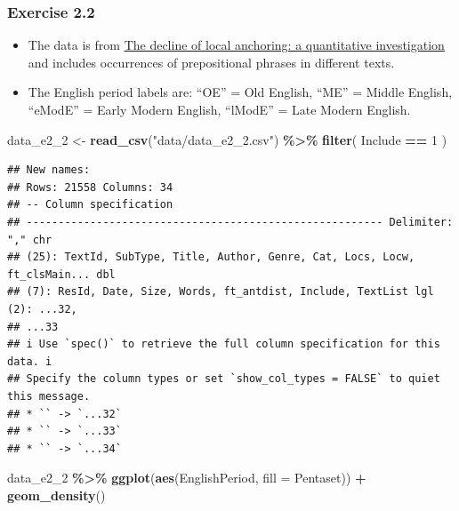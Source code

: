 \documentclass[
]{article}
\newenvironment{Shaded}{\begin{snugshade}}{\end{snugshade}}
\newcommand{\AttributeTok}[1]{\textcolor[rgb]{0.13,0.29,0.53}{#1}}
\newcommand{\DecValTok}[1]{\textcolor[rgb]{0.00,0.00,0.81}{#1}}
\newcommand{\FunctionTok}[1]{\textcolor[rgb]{0.13,0.29,0.53}{\textbf{#1}}}
\newcommand{\NormalTok}[1]{#1}
\newcommand{\OtherTok}[1]{\textcolor[rgb]{0.56,0.35,0.01}{#1}}
\newcommand{\SpecialCharTok}[1]{\textcolor[rgb]{0.81,0.36,0.00}{\textbf{#1}}}
\newcommand{\StringTok}[1]{\textcolor[rgb]{0.31,0.60,0.02}{#1}}
\providecommand{\tightlist}{%
  \setlength{\itemsep}{0pt}\setlength{\parskip}{0pt}}
\begin{document}
\subsubsection{Exercise 2.2}\label{exercise-2.2}

\begin{itemize}
\tightlist
\item
  The data is from \href{https://doi.org/10.1017/S1360674323000047}{The
  decline of local anchoring: a quantitative investigation} and includes
  occurrences of prepositional phrases in different texts.
\item
  The English period labels are: ``OE'' = Old English, ``ME'' = Middle
  English, ``eModE'' = Early Modern English, ``lModE'' = Late Modern
  English.
\end{itemize}

\begin{Shaded}
\begin{Highlighting}[]
\NormalTok{data\_e2\_2 }\OtherTok{\textless{}{-}} \FunctionTok{read\_csv}\NormalTok{(}\StringTok{"data/data\_e2\_2.csv"}\NormalTok{) }\SpecialCharTok{\%\textgreater{}\%}
  \FunctionTok{filter}\NormalTok{(}
\NormalTok{    Include }\SpecialCharTok{==} \DecValTok{1}
\NormalTok{  )}
\end{Highlighting}
\end{Shaded}

\begin{verbatim}
## New names:
## Rows: 21558 Columns: 34
## -- Column specification
## -------------------------------------------------------- Delimiter: "," chr
## (25): TextId, SubType, Title, Author, Genre, Cat, Locs, Locw, ft_clsMain... dbl
## (7): ResId, Date, Size, Words, ft_antdist, Include, TextList lgl (2): ...32,
## ...33
## i Use `spec()` to retrieve the full column specification for this data. i
## Specify the column types or set `show_col_types = FALSE` to quiet this message.
## * `` -> `...32`
## * `` -> `...33`
## * `` -> `...34`
\end{verbatim}

\begin{Shaded}
\begin{Highlighting}[]
\NormalTok{data\_e2\_2 }\SpecialCharTok{\%\textgreater{}\%}
  \FunctionTok{ggplot}\NormalTok{(}\FunctionTok{aes}\NormalTok{(EnglishPeriod, }\AttributeTok{fill =}\NormalTok{ Pentaset)) }\SpecialCharTok{+}
  \FunctionTok{geom\_density}\NormalTok{()}
\end{Highlighting}
\end{Shaded}
\end{document}
